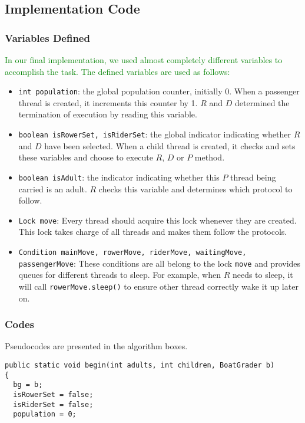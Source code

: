 \documentclass{article}
\begin{document}
\begin{spacing}{1.1}
\subsection{Implementation Code}
\subsubsection{Variables Defined}
\textcolor{green}{In our final implementation, we used almost completely different variables to accomplish the task. The defined variables are used as follows:}
\begin{itemize}
  \item \texttt{int population}: the global population counter, initially 0. When a passenger thread is created, it increments this counter by 1. $R$ and $D$ determined the termination of execution by reading this variable.\\
  \item \texttt{boolean isRowerSet, isRiderSet}: the global indicator indicating whether $R$ and $D$ have been selected. When a child thread is created, it checks and sets these variables and choose to execute $R$, $D$ or $P$ method.\\
  \item \texttt{boolean isAdult}: the indicator indicating whether this $P$ thread being carried is an adult. $R$ checks this variable and determines which protocol to follow.\\
  \item \texttt{Lock move}: Every thread should acquire this lock whenever they are created. This lock takes charge of all threads and makes them follow the protocols.\\
  \item \texttt{Condition mainMove, rowerMove, riderMove, waitingMove, passengerMove}: These conditions are all belong to the lock \texttt{move} and provides queues for different threads to sleep. For example, when $R$ needs to sleep, it will call \texttt{rowerMove.sleep()} to ensure other thread correctly wake it up later on.\\
\end{itemize}

\subsubsection{Codes}
Pseudocodes are presented in the algorithm boxes.\\

\begin{lstlisting}
public static void begin(int adults, int children, BoatGrader b)
{
  bg = b;
  isRowerSet = false;
  isRiderSet = false;
  population = 0;
	

\end{lstlisting}
\end{spacing}
\end{document}
